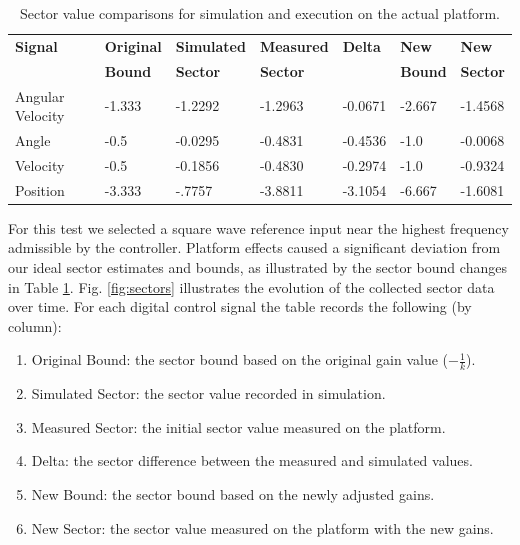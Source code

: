 \begin{table}[htb]
\centering

\begin{tabular}[width=0.95\columnwidth]{ | l | l | l | l | l | l | l | }

\hline
\textbf{Signal} & \textbf{Original} & \textbf{Simulated} & \textbf{Measured} & \textbf{Delta} & \textbf{New} & \textbf{New} \\
                & \textbf{Bound}    & \textbf{Sector}    & \textbf{Sector}  &                & \textbf{Bound} & \textbf{Sector} \\
\hline \hline
Angular Velocity & -1.333 & -1.2292 & -1.2963 & -0.0671 & -2.667 & -1.4568 \\
\hline
Angle & -0.5 & -0.0295 & -0.4831 & -0.4536 & -1.0 & -0.0068 \\
\hline
Velocity & -0.5 & -0.1856 & -0.4830 & -0.2974 & -1.0 &  -0.9324 \\
\hline
Position & -3.333 & -.7757 & -3.8811 & -3.1054 & -6.667 & -1.6081 \\
\hline
\end{tabular}
\caption{Sector value comparisons for simulation and execution on the actual platform.}
\label{tab:sectors}
\end{table}

For this test we selected a square wave reference input near the highest frequency admissible by the controller.  Platform effects caused a significant deviation from our ideal sector estimates and bounds, as illustrated by the sector bound changes in Table \ref{tab:sectors}.  Fig. \ref{fig:sectors} illustrates the evolution of the collected sector data over time. For each digital control signal the table records the following (by column):
\begin{enumerate}
 \item Original Bound: the sector bound based on the original gain value ($-\frac{1}{k}$).
 \item Simulated Sector: the sector value recorded in simulation.
 \item Measured Sector: the initial sector value measured on the platform.
 \item Delta: the sector difference between the measured and simulated values.
 \item New Bound: the sector bound based on the newly adjusted gains.
 \item New Sector: the sector value measured on the platform with the new gains.
\end{enumerate}


